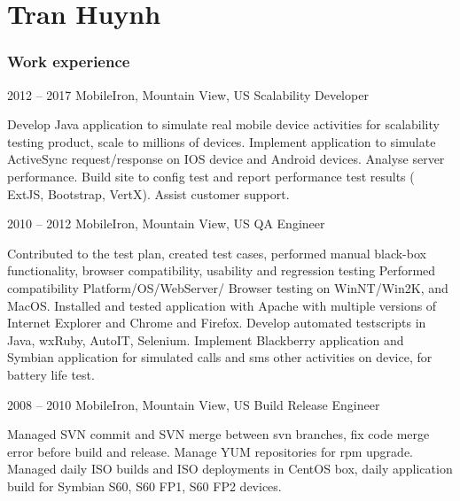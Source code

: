 \documentclass{tccv}
\begin{document}
\part{Tran Huynh}

\section{Work experience}

\begin{eventlist}

\item{2012 -- 2017}
     {MobileIron, Mountain View, US}
     {Scalability Developer}

Develop Java application to simulate real mobile device
activities for scalability testing product, scale to millions
of devices.
Implement application to simulate ActiveSync request/response on IOS device and Android devices.
Analyse server performance.
\newline Build site to config test and report performance test results
 ( ExtJS, Bootstrap, VertX).
\newline Assist customer support.

\item{2010 -- 2012}
     {MobileIron, Mountain View, US}
     {QA Engineer}

Contributed to the test plan, created test cases,
  performed manual black-box functionality, browser
  compatibility, usability and regression testing
\newline Performed compatibility Platform/OS/WebServer/
\newline Browser testing on WinNT/Win2K, and MacOS.
  Installed and tested application with Apache with
  multiple versions of Internet Explorer and Chrome and Firefox.
\newline Develop automated testscripts in Java, wxRuby, AutoIT, Selenium.
\newline Implement Blackberry application and Symbian application for simulated
calls and sms other activities on device, for battery life test.

\item{2008 -- 2010}
     {MobileIron, Mountain View, US}
     {Build Release Engineer}

Managed SVN commit and SVN merge between svn branches,
  fix code merge error before build and release.
\newline Manage YUM repositories for rpm upgrade.
\newline Managed daily ISO builds and ISO deployments in CentOS box,
  daily application build for Symbian S60, S60 FP1, S60 FP2 devices.


\end{eventlist}
\end{document}
